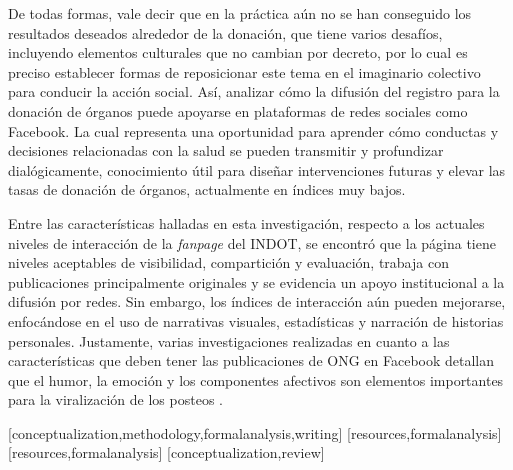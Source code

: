 \documentclass[spanish]{textolivre}
\begin{document}
De todas formas, vale decir que en la práctica aún no se han conseguido los resultados deseados alrededor de la donación, que tiene varios desafíos, incluyendo elementos culturales que no cambian por decreto, por lo cual es preciso establecer formas de reposicionar este tema en el imaginario colectivo para conducir la acción social. Así, analizar cómo la difusión del registro para la donación de órganos puede apoyarse en plataformas de redes sociales como Facebook. La cual representa una oportunidad para aprender cómo conductas y decisiones relacionadas con la salud se pueden transmitir y profundizar dialógicamente, conocimiento útil para diseñar intervenciones futuras y elevar las tasas de donación de órganos, actualmente en índices muy bajos.

Entre las características halladas en esta investigación, respecto a los actuales niveles de interacción de la \emph{fanpage} del INDOT, se encontró que la página tiene niveles aceptables de visibilidad, compartición y evaluación, trabaja con publicaciones principalmente originales y se evidencia un apoyo institucional a la difusión por redes. Sin embargo, los índices de interacción aún pueden mejorarse, enfocándose en el uso de narrativas visuales, estadísticas y narración de historias personales. Justamente, varias investigaciones realizadas en cuanto a las características que deben tener las publicaciones de ONG en Facebook detallan que el humor, la emoción y los componentes afectivos son elementos importantes para la viralización de los posteos \cite{arroyo-almaraz2018}.


\printbibliography\label{sec-bib}


\begin{contributors}
[conceptualization,methodology,formalanalysis,writing] %
[resources,formalanalysis] %
[resources,formalanalysis]
[conceptualization,review]
\end{contributors}
\end{document}
